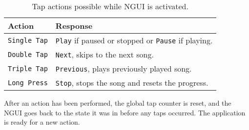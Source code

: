 \begin{table}
\begin{tabular}{|l|l|} \hline
	\textbf{Action} & \textbf{Response} \\\hline
	\texttt{Single Tap} & \texttt{Play} if paused or stopped or \texttt{Pause} if playing. \\\hline
	\texttt{Double Tap} & \texttt{Next}, skips to the next song. \\\hline
	\texttt{Triple Tap} & \texttt{Previous}, plays previously played song. \\\hline
	\texttt{Long Press} & \texttt{Stop}, stops the song and resets the progress. \\\hline		
\end{tabular}
\caption[Table caption text]{Tap actions possible while NGUI is activated.}
\label{table:tap}
\end{table}

After an action has been performed, the global tap counter is reset, and the NGUI goes back to the state it was in before any taps occurred. The application is ready for a new action.